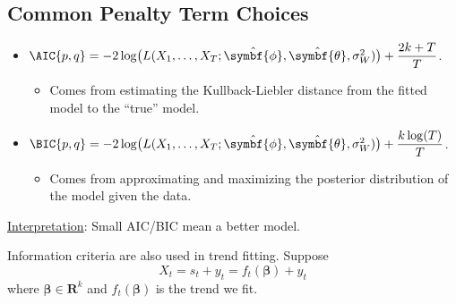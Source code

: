 \subsection*{Common Penalty Term Choices}
\begin{itemize}
    \item $ \AIC{p,q}=-2\log\bigl(L(X_1,\ldots,X_T;\hat{\symbf{\phi}},\hat{\symbf{\theta}},\sigma_W^2)\bigr)+\dfrac{2k+T}{T} $.
          \begin{itemize}
              \item Comes from estimating the Kullback-Liebler distance from the fitted model to the ``true'' model.
          \end{itemize}
    \item $ \BIC{p,q}=-2\log\bigl(L(X_1,\ldots,X_T;\hat{\symbf{\phi}},\hat{\symbf{\theta}},\sigma_W^2)\bigr)+\dfrac{k\log(T)}{T} $.
          \begin{itemize}
              \item Comes from approximating and maximizing the posterior distribution of the model given the data.
          \end{itemize}
\end{itemize}
\underline{Interpretation}: Small AIC/BIC mean a better model.

Information criteria are also used in trend fitting. Suppose
\[ X_t=s_t+y_t=f_t(\symbf{\beta})+y_t \]
where $ \symbf{\beta}\in\mathbf{R}^k $ and $ f_t(\symbf{\beta}) $ is the trend we fit.

